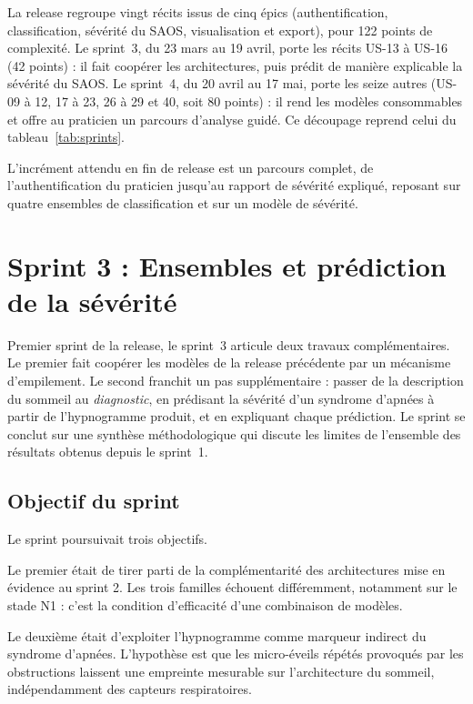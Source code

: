 La release regroupe vingt récits issus de cinq épics (authentification, classification,
sévérité du SAOS, visualisation et export), pour 122 points de complexité. Le sprint~3, du
23 mars au 19 avril, porte les récits US-13 à US-16 (42 points) : il fait coopérer les
architectures, puis prédit de manière explicable la sévérité du SAOS. Le sprint~4, du
20 avril au 17 mai, porte les seize autres (US-09 à 12, 17 à 23, 26 à 29 et 40, soit
80 points) : il rend les modèles consommables et offre au praticien un parcours d'analyse
guidé. Ce découpage reprend celui du tableau~\ref{tab:sprints}.

L'incrément attendu en fin de release est un parcours complet, de l'authentification du
praticien jusqu'au rapport de sévérité expliqué, reposant sur quatre ensembles de
classification et sur un modèle de sévérité.

\section{Sprint 3 : Ensembles et prédiction de la sévérité}
\label{sec:sprint3}

Premier sprint de la release, le sprint~3 articule deux travaux complémentaires. Le premier
fait coopérer les modèles de la release précédente par un mécanisme d'empilement. Le second
franchit un pas supplémentaire : passer de la description du sommeil au \emph{diagnostic},
en prédisant la sévérité d'un syndrome d'apnées à partir de l'hypnogramme produit, et en
expliquant chaque prédiction. Le sprint se conclut sur une synthèse méthodologique qui
discute les limites de l'ensemble des résultats obtenus depuis le sprint~1.

\subsection{Objectif du sprint}

Le sprint poursuivait trois objectifs.

Le premier était de tirer parti de la complémentarité des architectures mise en
évidence au sprint 2. Les trois familles échouent différemment, notamment sur le stade
N1 : c'est la condition d'efficacité d'une combinaison de modèles.

Le deuxième était d'exploiter l'hypnogramme comme marqueur indirect du syndrome
d'apnées. L'hypothèse est que les micro-éveils répétés provoqués par les obstructions
laissent une empreinte mesurable sur l'architecture du sommeil, indépendamment des
capteurs respiratoires.

